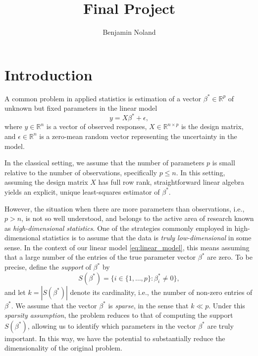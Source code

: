\documentclass[letterpaper,12pt]{article}
\title{Final Project}
\author{Benjamin Noland}
\date{}
\begin{document}
\maketitle

\section*{Introduction}

A common problem in applied statistics is estimation of a vector
$\beta^\ast \in \mathbb{R}^p$ of unknown but fixed parameters in the
linear model
\begin{equation} \label{eq:linear_model}
  y = X\beta^\ast + \epsilon,
\end{equation}
where $y \in \mathbb{R}^n$ is a vector of observed responses,
$X \in \mathbb{R}^{n \times p}$ is the design matrix, and
$\epsilon \in \mathbb{R}^n$ is a zero-mean random vector representing
the uncertainty in the model.

In the classical setting, we assume that the number of parameters $p$
is small relative to the number of observations, specifically
$p \leq n$. In this setting, assuming the design matrix $X$ has full
row rank, straightforward linear algebra yields an explicit, unique
least-squares estimator of $\beta^\ast$.

However, the situation when there are more parameters than
observations, i.e., $p > n$, is not so well understood, and belongs to
the active area of research known as \textit{high-dimensional
  statistics}. One of the strategies commonly employed in
high-dimensional statistics is to assume that the data is \emph{truly
  low-dimensional} in some sense. In the context of our linear model
\eqref{eq:linear_model}, this means assuming that a large number of
the entries of the true parameter vector $\beta^\ast$ are zero. To be
precise, define the \textit{support} of $\beta^\ast$ by
\begin{equation*}
  S(\beta^\ast) = \{i \in \{1, \ldots, p\} : \beta^\ast_i \neq 0\},
\end{equation*}
and let $k = |S(\beta^\ast)|$ denote its cardinality, i.e., the number
of non-zero entries of $\beta^\ast$. We assume that the vector
$\beta^\ast$ is \textit{sparse}, in the sense that $k \ll p$. Under
this \textit{sparsity assumption}, the problem reduces to that of
computing the support $S(\beta^\ast)$, allowing us to identify which
parameters in the vector $\beta^\ast$ are truly important. In this
way, we have the potential to substantially reduce the dimensionality
of the original problem.
\end{document}
